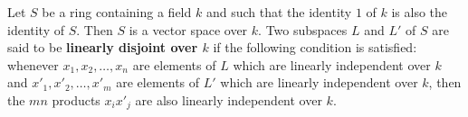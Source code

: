 Let $S$ be a ring containing a field $k$ and such that the identity $1$ of $k$ is also the identity of $S$. Then $S$ is a vector space over $k$. Two subspaces $L$ and $L'$ of $S$ are said to be \textbf{linearly disjoint over $k$} if the following condition is satisfied: whenever $x_1, x_2, \dots, x_n$ are elements of $L$ which are linearly independent over $k$ and $x'_1, x'_2, \dots, x'_m$ are elements of $L'$ which are linearly independent over $k$, then the $mn$ products $x_i x'_j$ are also linearly independent over $k$.

